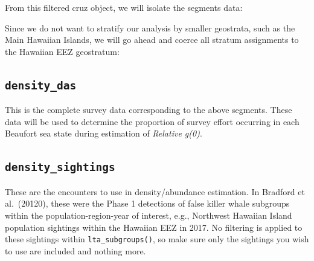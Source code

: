 \documentclass[
]{book}
\newenvironment{Shaded}{\begin{snugshade}}{\end{snugshade}}
\newcommand{\NormalTok}[1]{#1}
\newcommand{\OperatorTok}[1]{\textcolor[rgb]{0.81,0.36,0.00}{\textbf{#1}}}
\newcommand{\StringTok}[1]{\textcolor[rgb]{0.31,0.60,0.02}{#1}}
\begin{document}
From this filtered cruz object, we will isolate the segments data:

\begin{Shaded}
\end{Shaded}

Since we do not want to stratify our analysis by smaller geostrata, such as the Main Hawaiian Islands, we will go ahead and coerce all stratum assignments to the Hawaiian EEZ geostratum:

\begin{Shaded}
\end{Shaded}

\hypertarget{density_das}{%
\subsection*{\texorpdfstring{\texttt{density\_das}}{density\_das}}\label{density_das}}

This is the complete survey data corresponding to the above segments. These data will be used to determine the proportion of survey effort occurring in each Beaufort sea state during estimation of \emph{Relative g(0)}.

\begin{Shaded}
\end{Shaded}

\hypertarget{density_sightings}{%
\subsection*{\texorpdfstring{\texttt{density\_sightings}}{density\_sightings}}\label{density_sightings}}

These are the encounters to use in density/abundance estimation. In Bradford et al.~(20120), these were the Phase 1 detections of false killer whale subgroups within the population-region-year of interest, e.g., Northwest Hawaiian Island population sightings within the Hawaiian EEZ in 2017. No filtering is applied to these sightings within \texttt{lta\_subgroups()}, so make sure only the sightings you wish to use are included and nothing more.
\end{document}

